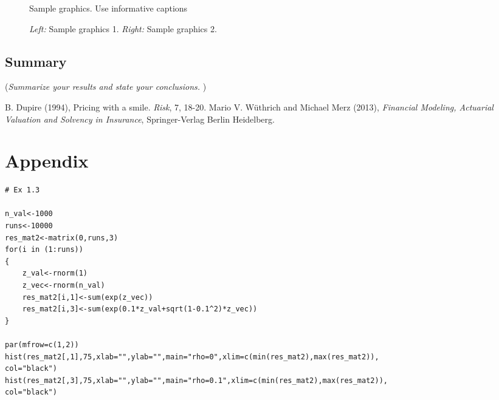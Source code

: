 \documentclass[11pt]{article}
\begin{document}
 \begin{figure}[!ht]
 \center
  \caption{Sample graphics. Use informative captions}
  \label{fig:samplefig1}
\end{figure}


 \begin{figure}[!ht]
 \center
  \caption{\emph{Left:} Sample graphics 1. \emph{Right:} Sample graphics 2.}
  \label{fig:samplefig2}
\end{figure}


\subsection*{Summary}
({\it Summarize your results and state your conclusions. })



\begin{thebibliography}{99}
B. Dupire (1994),
Pricing with a smile.
\emph{Risk}, 7, 18-20.
  Mario V. W\"{u}thrich and Michael Merz (2013),
  \emph{Financial Modeling, Actuarial Valuation and Solvency in Insurance},
  Springer-Verlag Berlin Heidelberg.
\end{thebibliography}


\section*{Appendix}

\begin{verbatim}
# Ex 1.3

n_val<-1000
runs<-10000
res_mat2<-matrix(0,runs,3)
for(i in (1:runs))
{
	z_val<-rnorm(1)
	z_vec<-rnorm(n_val)
	res_mat2[i,1]<-sum(exp(z_vec))
	res_mat2[i,3]<-sum(exp(0.1*z_val+sqrt(1-0.1^2)*z_vec))
}

par(mfrow=c(1,2))
hist(res_mat2[,1],75,xlab="",ylab="",main="rho=0",xlim=c(min(res_mat2),max(res_mat2)),
col="black")
hist(res_mat2[,3],75,xlab="",ylab="",main="rho=0.1",xlim=c(min(res_mat2),max(res_mat2)),
col="black")
\end{verbatim}
\end{document}
